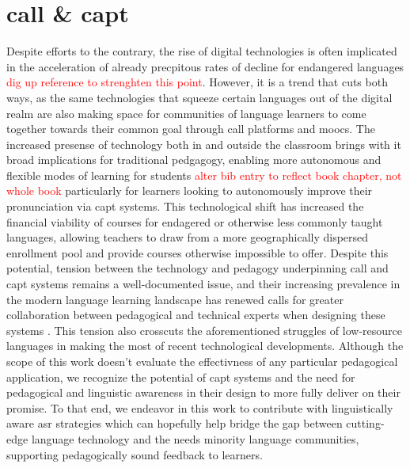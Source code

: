 \documentclass[thesis]{cluu}
\newcommand{\todo}[1]{\textcolor{red}{#1}}
\begin{document}
\section{\acrfull{call} \& \acrfull{capt}}
Despite efforts to the contrary, the rise of digital technologies is often implicated in the acceleration of already precpitous rates of decline for endangered languages \todo{dig up reference to strenghten this point}. However, it is a trend that cuts both ways, as the same technologies that squeeze certain languages out of the digital realm are also making space for communities of language learners to come together towards their common goal through \gls{call} platforms and \gls{mooc}s. The increased presense of technology both in and outside the classroom brings with it broad implications for traditional pedgagogy, enabling more autonomous and flexible modes of learning for students \parencite{spolskyHandbookEducationalLinguistics2008}\todo{alter bib entry to reflect book chapter, not whole book} particularly for learners looking to autonomously improve their pronunciation via \gls{capt} systems. This technological shift has increased the financial viability of courses for endagered or otherwise less commonly taught languages, allowing teachers to draw from a more geographically dispersed enrollment pool and provide courses otherwise impossible to offer. Despite this potential, tension between the technology and pedagogy underpinning \gls{call} and \gls{capt} systems remains a well-documented issue, and their increasing prevalence in the modern language learning landscape has renewed calls for greater collaboration between pedagogical and technical experts when designing these systems \parencite{rogerson-revellComputerAssistedPronunciationTraining2021}. This tension also crosscuts the aforementioned struggles of low-resource languages in making the most of recent technological developments. Although the scope of this work doesn't evaluate the effectivness of any particular pedagogical application, we recognize the potential of \gls{capt} systems and the need for pedagogical and linguistic awareness in their design to more fully deliver on their promise. To that end, we endeavor in this work to contribute with linguistically aware \gls{asr} strategies which can hopefully help bridge the gap between cutting-edge language technology and the needs minority language communities, supporting pedagogically sound feedback to learners.
\end{document}
